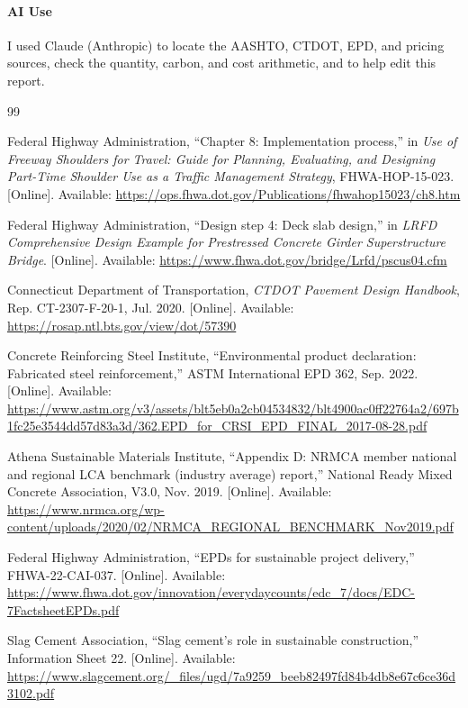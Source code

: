 \documentclass[11pt]{article}
\begin{document}
\paragraph{AI Use}
I used Claude (Anthropic) to locate the AASHTO, CTDOT, EPD, and pricing sources, check the quantity, carbon, and cost arithmetic, and to help edit this report. 
\begin{thebibliography}{99}
\footnotesize
\setlength{\itemsep}{0pt}

Federal Highway Administration, ``Chapter 8: Implementation process,'' in \emph{Use of Freeway Shoulders for Travel: Guide for Planning, Evaluating, and Designing Part-Time Shoulder Use as a Traffic Management Strategy}, FHWA-HOP-15-023. [Online]. Available: \url{https://ops.fhwa.dot.gov/Publications/fhwahop15023/ch8.htm}

Federal Highway Administration, ``Design step 4: Deck slab design,'' in \emph{LRFD Comprehensive Design Example for Prestressed Concrete Girder Superstructure Bridge}. [Online]. Available: \url{https://www.fhwa.dot.gov/bridge/Lrfd/pscus04.cfm}

Connecticut Department of Transportation, \emph{CTDOT Pavement Design Handbook}, Rep. CT-2307-F-20-1, Jul. 2020. [Online]. Available: \url{https://rosap.ntl.bts.gov/view/dot/57390}

Concrete Reinforcing Steel Institute, ``Environmental product declaration: Fabricated steel reinforcement,'' ASTM International EPD 362, Sep. 2022. [Online]. Available: \url{https://www.astm.org/v3/assets/blt5eb0a2cb04534832/blt4900ac0ff22764a2/697b1fc25e3544dd57d83a3d/362.EPD_for_CRSI_EPD_FINAL_2017-08-28.pdf}

Athena Sustainable Materials Institute, ``Appendix D: NRMCA member national and regional LCA benchmark (industry average) report,'' National Ready Mixed Concrete Association, V3.0, Nov. 2019. [Online]. Available: \url{https://www.nrmca.org/wp-content/uploads/2020/02/NRMCA_REGIONAL_BENCHMARK_Nov2019.pdf}

Federal Highway Administration, ``EPDs for sustainable project delivery,'' FHWA-22-CAI-037. [Online]. Available: \url{https://www.fhwa.dot.gov/innovation/everydaycounts/edc_7/docs/EDC-7FactsheetEPDs.pdf}

Slag Cement Association, ``Slag cement's role in sustainable construction,'' Information Sheet 22. [Online]. Available: \url{https://www.slagcement.org/_files/ugd/7a9259_beeb82497fd84b4db8e67c6ce36d3102.pdf}


\end{thebibliography}
\end{document}
